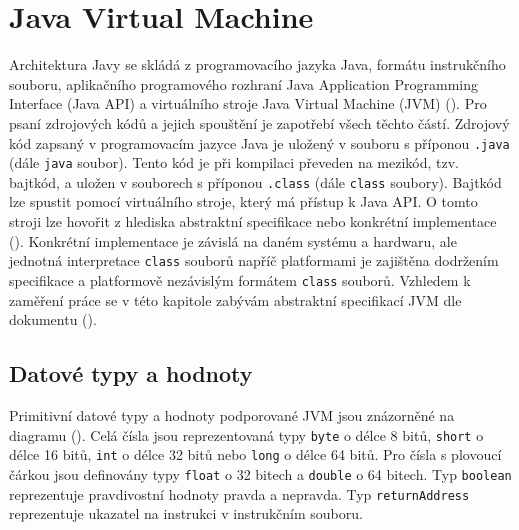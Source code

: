 \chapter{Java Virtual Machine}


Architektura Javy se skládá z programovacího jazyka Java, formátu instrukčního souboru, aplikačního programového rozhraní Java Application Programming Interface (Java API) a virtuálního stroje Java Virtual Machine (JVM) (). Pro psaní zdrojových kódů a jejich spouštění je zapotřebí všech těchto částí.
Zdrojový kód zapsaný v programovacím jazyce Java je uložený v souboru s příponou \texttt{.java} (dále \texttt{java} soubor). Tento kód je při kompilaci převeden na mezikód, tzv. bajtkód, a uložen v souborech s příponou \texttt{.class} (dále \texttt{class} soubory). Bajtkód lze spustit pomocí virtuálního stroje, který má přístup k Java API. O tomto stroji lze hovořit z hlediska abstraktní specifikace nebo konkrétní implementace (). Konkrétní implementace je závislá na daném systému a hardwaru, ale jednotná interpretace \texttt{class} souborů napříč platformami je zajištěna dodržením specifikace a platformově nezávislým formátem \texttt{class} souborů. Vzhledem k zaměření práce se v této kapitole zabývám abstraktní specifikací JVM dle dokumentu (). 



\section{Datové typy a hodnoty}


Primitivní datové typy a hodnoty podporované JVM jsou znázorněné na diagramu (). Celá čísla jsou reprezentovaná typy \texttt{byte} o délce 8 bitů, \texttt{short} o délce 16 bitů, \texttt{int} o délce 32 bitů nebo \texttt{long} o délce 64 bitů. Pro čísla s plovoucí čárkou jsou definovány typy \texttt{float} o 32 bitech a \texttt{double} o 64 bitech. Typ \texttt{boolean} reprezentuje pravdivostní hodnoty pravda a nepravda. Typ \texttt{returnAddress} reprezentuje ukazatel na instrukci v instrukčním souboru.

